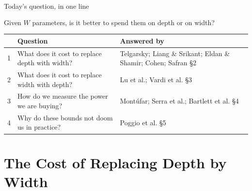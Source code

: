\documentclass[aspectratio=169, 11pt]{beamer}
\newcommand{\nosrc}{}       %
\begin{document}
\begin{frame}{Today's question, in one line}
  \nosrc
  \vspace{-0.05em}
  \begin{center}
    {\large Given $W$ parameters, is it better to spend them on
    \alert{depth} or on \alert{width}?}
  \end{center}
  \vspace{0.15em}
  \centering
  \renewcommand{\arraystretch}{1.35}
  {\small
  \begin{tabular}{p{} p{}
                  p{}}
    & \textbf{Question} & \textbf{Answered by}\\
    \hline
    1 & What does it cost to replace depth with width?
      & Telgarsky; Liang \& Srikant; Eldan \& Shamir; Cohen;
        Safran \hfill{\scriptsize \S2}\\
    2 & What does it cost to replace width with depth?
      & Lu et al.; Vardi et al. \hfill{\scriptsize \S3}\\
    3 & How do we measure the power we are buying?
      & Mont\'ufar; Serra et al.; Bartlett et al.
        \hfill{\scriptsize \S4}\\
    4 & Why do these bounds not doom us in practice?
      & Poggio et al. \hfill{\scriptsize \S5}\\
    \hline
  \end{tabular}}
\end{frame}

\section{The Cost of Replacing Depth by Width}
\end{document}
